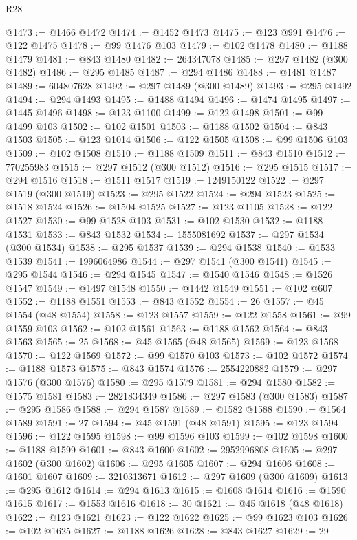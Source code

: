 \begin{lexlean}{R28}
\begin{coremodule}
@1473 := @1466 @1472
@1474 := @1452 @1473
@1475 := @123 @991
@1476 := @122 @1475
@1478 := @99 @1476 @103
@1479 := @102 @1478
@1480 := @1188 @1479
@1481 := @843 @1480
@1482 := 264347078
@1485 := @297 @1482 (@300 @1482)
@1486 := @295 @1485
@1487 := @294 @1486
@1488 := @1481 @1487
@1489 := 604807628
@1492 := @297 @1489 (@300 @1489)
@1493 := @295 @1492
@1494 := @294 @1493
@1495 := @1488 @1494
@1496 := @1474 @1495
@1497 := @1445 @1496
@1498 := @123 @1100
@1499 := @122 @1498
@1501 := @99 @1499 @103
@1502 := @102 @1501
@1503 := @1188 @1502
@1504 := @843 @1503
@1505 := @123 @1014
@1506 := @122 @1505
@1508 := @99 @1506 @103
@1509 := @102 @1508
@1510 := @1188 @1509
@1511 := @843 @1510
@1512 := 770255983
@1515 := @297 @1512 (@300 @1512)
@1516 := @295 @1515
@1517 := @294 @1516
@1518 := @1511 @1517
@1519 := 1249150122
@1522 := @297 @1519 (@300 @1519)
@1523 := @295 @1522
@1524 := @294 @1523
@1525 := @1518 @1524
@1526 := @1504 @1525
@1527 := @123 @1105
@1528 := @122 @1527
@1530 := @99 @1528 @103
@1531 := @102 @1530
@1532 := @1188 @1531
@1533 := @843 @1532
@1534 := 1555081692
@1537 := @297 @1534 (@300 @1534)
@1538 := @295 @1537
@1539 := @294 @1538
@1540 := @1533 @1539
@1541 := 1996064986
@1544 := @297 @1541 (@300 @1541)
@1545 := @295 @1544
@1546 := @294 @1545
@1547 := @1540 @1546
@1548 := @1526 @1547
@1549 := @1497 @1548
@1550 := @1442 @1549
@1551 := @102 @607
@1552 := @1188 @1551
@1553 := @843 @1552
@1554 := 26
@1557 := @45 @1554 (@48 @1554)
@1558 := @123 @1557
@1559 := @122 @1558
@1561 := @99 @1559 @103
@1562 := @102 @1561
@1563 := @1188 @1562
@1564 := @843 @1563
@1565 := 25
@1568 := @45 @1565 (@48 @1565)
@1569 := @123 @1568
@1570 := @122 @1569
@1572 := @99 @1570 @103
@1573 := @102 @1572
@1574 := @1188 @1573
@1575 := @843 @1574
@1576 := 2554220882
@1579 := @297 @1576 (@300 @1576)
@1580 := @295 @1579
@1581 := @294 @1580
@1582 := @1575 @1581
@1583 := 2821834349
@1586 := @297 @1583 (@300 @1583)
@1587 := @295 @1586
@1588 := @294 @1587
@1589 := @1582 @1588
@1590 := @1564 @1589
@1591 := 27
@1594 := @45 @1591 (@48 @1591)
@1595 := @123 @1594
@1596 := @122 @1595
@1598 := @99 @1596 @103
@1599 := @102 @1598
@1600 := @1188 @1599
@1601 := @843 @1600
@1602 := 2952996808
@1605 := @297 @1602 (@300 @1602)
@1606 := @295 @1605
@1607 := @294 @1606
@1608 := @1601 @1607
@1609 := 3210313671
@1612 := @297 @1609 (@300 @1609)
@1613 := @295 @1612
@1614 := @294 @1613
@1615 := @1608 @1614
@1616 := @1590 @1615
@1617 := @1553 @1616
@1618 := 30
@1621 := @45 @1618 (@48 @1618)
@1622 := @123 @1621
@1623 := @122 @1622
@1625 := @99 @1623 @103
@1626 := @102 @1625
@1627 := @1188 @1626
@1628 := @843 @1627
@1629 := 29

\end{coremodule}
\end{lexlean}
